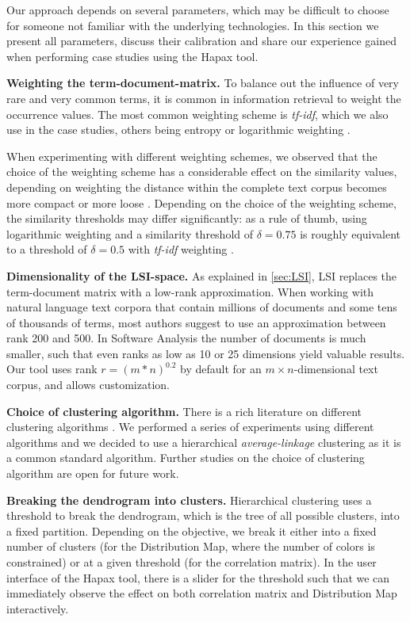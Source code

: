 Our approach depends on several parameters, which may be difficult to choose for someone not familiar with the underlying technologies. In this section we present all parameters, discuss their calibration and share our experience gained when performing case studies using the Hapax tool.

  \textbf{Weighting the term-document-matrix.} To balance out the influence of very rare and very common terms, it is common in information retrieval to weight the occurrence values. The most common weighting scheme is \emph{tf-idf}, which we also use in the case studies, others being entropy or logarithmic weighting \cite{Duma91a}.

  When experimenting with different weighting schemes, we observed that the choice of the weighting scheme has a considerable effect on the similarity values, depending on weighting the distance within the complete text corpus becomes more compact or more loose \cite{Nako01b}. Depending on the choice of the weighting scheme, the similarity thresholds may differ significantly: as a rule of thumb, using logarithmic weighting and a similarity threshold of $\delta = 0.75$ is roughly equivalent to a threshold of $\delta = 0.5$ with \emph{tf-idf} weighting \cite{Nako01a}.

  \textbf{Dimensionality of the LSI-space.} As explained in \autoref{sec:LSI}, LSI replaces the term-document matrix with a low-rank approximation. When working with natural language text corpora that contain millions of documents and some tens of thousands of terms, most authors suggest to use an approximation between rank 200 and 500. In Software Analysis the number of documents is much smaller, such that even ranks as low as 10 or 25 dimensions yield valuable results. Our tool uses rank $r = (m * n)^{0.2}$ by default for an $m \times n$-dimensional text corpus, and allows customization.

  \textbf{Choice of clustering algorithm.} There is a rich literature on different clustering algorithms \cite{Jain99a}. We performed a series of experiments using different algorithms and we decided to use a hierarchical \emph{average-linkage} clustering as it is a common standard algorithm. Further studies on the choice of clustering algorithm are open for future work.

  \textbf{Breaking the dendrogram into clusters.} Hierarchical clustering uses a threshold to break the dendrogram, which is the tree of all possible clusters, into a fixed partition. Depending on the objective, we break it either into a fixed number of clusters (\eg for the Distribution Map, where the number of colors is constrained) or at a given threshold (\eg for the correlation matrix). In the user interface of the Hapax tool, there is a slider for the threshold such that we can immediately observe the effect on both correlation matrix and Distribution Map interactively.

